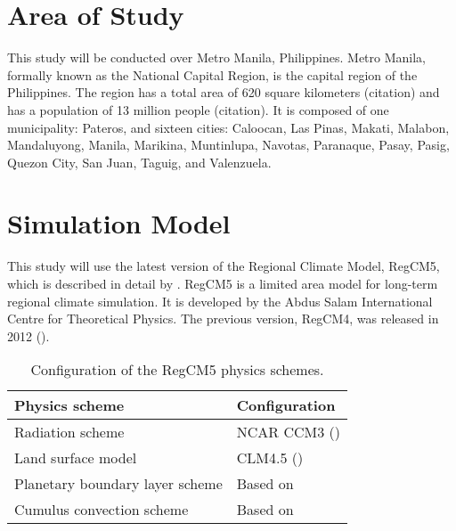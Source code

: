 \section{Area of Study}
	This study will be conducted over Metro Manila, Philippines.
	Metro Manila, formally known as the National Capital Region, is the capital region of the Philippines.
	The region has a total area of 620 square kilometers (citation)
		and has a population of 13 million people (citation).
	It is composed of one municipality: Pateros, and sixteen cities:
		Caloocan,
		Las Pinas,
		Makati,
		Malabon,
		Mandaluyong,
		Manila,
		Marikina,
		Muntinlupa,
		Navotas,
		Paranaque,
		Pasay,
		Pasig,
		Quezon City,
		San Juan,
		Taguig, and
		Valenzuela.
		
\section{Simulation Model}
	This study will use the latest version of the Regional Climate Model, RegCM5, which is described in detail by \textcite{Giorgi2023}.
	RegCM5 is a limited area model for long-term regional climate simulation.
	It is developed by the Abdus Salam International Centre for Theoretical Physics.
	The previous version, RegCM4, was released in 2012 (\cite{Giorgi2012}).
	
	\begin{table}
		\label{tab:physics-schemes}
		\caption{Configuration of the RegCM5 physics schemes.}
		\centering
		\begin{tabular}{l l}
			\hline \hline
			Physics scheme & Configuration\\
			\hline
			Radiation scheme & NCAR CCM3 (\cite{Kiehl1996}) \\
			Land surface model & CLM4.5 (\cite{Oleson2013})\\
			Planetary boundary layer scheme & Based on \textcite{Holtslag1990}\\
			Cumulus convection scheme & Based on \textcite{Emanuel1991}\\
			\hline
		\end{tabular}		
	\end{table}